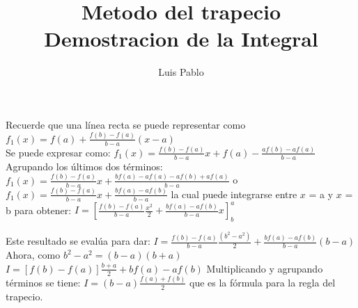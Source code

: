 \documentclass[12pt]{article}
\title{Metodo del trapecio \\Demostracion de la Integral}
\author{Luis Pablo}
\newcommand{\escribir}[1]{\singlespacing#1\singlespacing}
\newcommand{\fraccion}[2]{\displaystyle{\frac{#1}{#2}}}
\begin{document}
\maketitle
	\escribir{Recuerde que una línea recta se puede representar como}
	$f_1(x)=f(a)+\fraccion{f(b)-f(a)}{b-a}(x-a)$\\
	\escribir{Se puede expresar como:}
	$f_1(x)=\fraccion{f(b)-f(a)}{b-a}x+f(a)-\fraccion{af(b)-af(a)}{b-a}$
	\escribir{Agrupando los \'ultimos dos t\'erminos:}
	$f_1(x)=\fraccion{f(b)-f(a)}{b-a}x+\fraccion{bf(a)-af(a)-af(b)+af(a)}{b-a}$
	\escribir{o}
	$f_1(x)=\fraccion{f(b)-f(a)}{b-a}x+\fraccion{bf(a)-af(b)}{b-a}$
	\escribir{la cual puede integrarse entre $x$ = a y $x$ = b para obtener:}
	$I=\left[\fraccion{f(b)-f(a)}{b-a}\fraccion{x^2}{2}+\fraccion{bf(a)-af(b)}{b-a}x\right]_{b}^{a}$
	
	\escribir{Este resultado se evalúa para dar:}
	$I=\fraccion{f(b)-f(a)}{b-a}\fraccion{(b^2-a^2)}{2}+\fraccion{bf(a)-af(b)}{b-a}(b-a) $
	\escribir{Ahora, como $b^2-a^2=(b-a)(b+a)$}
	$I=[f(b)-f(a)]\fraccion{b+a}{2}+bf(a)-af(b)$
	\escribir{Multiplicando y agrupando t\'erminos se tiene:}
	$I=(b-a)\fraccion{f(a)+f(b)}{2}$
	\escribir{que es la fórmula para la regla del trapecio.}
	
\end{document}
